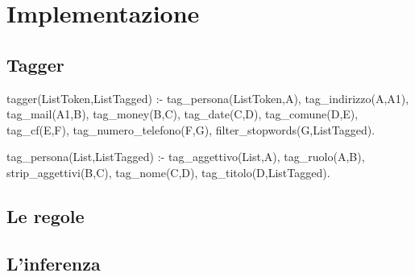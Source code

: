 \section{Implementazione}
\subsection{Tagger}
\begin{prologcode}
tagger(ListToken,ListTagged) :-
    tag_persona(ListToken,A),
    tag_indirizzo(A,A1),
    tag_mail(A1,B),
    tag_money(B,C),
    tag_date(C,D),
    tag_comune(D,E),
    tag_cf(E,F),
    tag_numero_telefono(F,G),
    filter_stopwords(G,ListTagged).
\end{prologcode}

\begin{prologcode}
tag_persona(List,ListTagged) :-
	tag_aggettivo(List,A),
	tag_ruolo(A,B),
	strip_aggettivi(B,C),
	tag_nome(C,D),
	tag_titolo(D,ListTagged).
\end{prologcode}


\subsection{Le regole}
\subsection{L'inferenza}